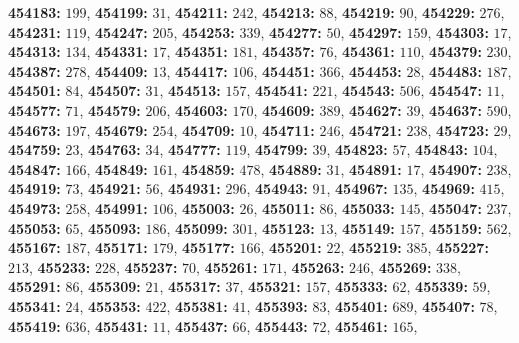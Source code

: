 \textsf{\bfseries 454183:} $199$, \textsf{\bfseries 454199:} $31$, \textsf{\bfseries 454211:} $242$, \textsf{\bfseries 454213:} $88$, \textsf{\bfseries 454219:} $90$, \textsf{\bfseries 454229:} $276$, \textsf{\bfseries 454231:} $119$, \textsf{\bfseries 454247:} $205$, \textsf{\bfseries 454253:} $339$, \textsf{\bfseries 454277:} $50$, \textsf{\bfseries 454297:} $159$, \textsf{\bfseries 454303:} $17$, \textsf{\bfseries 454313:} $134$, \textsf{\bfseries 454331:} $17$, \textsf{\bfseries 454351:} $181$, \textsf{\bfseries 454357:} $76$, \textsf{\bfseries 454361:} $110$, \textsf{\bfseries 454379:} $230$, \textsf{\bfseries 454387:} $278$, \textsf{\bfseries 454409:} $13$, \textsf{\bfseries 454417:} $106$, \textsf{\bfseries 454451:} $366$, \textsf{\bfseries 454453:} $28$, \textsf{\bfseries 454483:} $187$, \textsf{\bfseries 454501:} $84$, \textsf{\bfseries 454507:} $31$, \textsf{\bfseries 454513:} $157$, \textsf{\bfseries 454541:} $221$, \textsf{\bfseries 454543:} $506$, \textsf{\bfseries 454547:} $11$, \textsf{\bfseries 454577:} $71$, \textsf{\bfseries 454579:} $206$, \textsf{\bfseries 454603:} $170$, \textsf{\bfseries 454609:} $389$, \textsf{\bfseries 454627:} $39$, \textsf{\bfseries 454637:} $590$, \textsf{\bfseries 454673:} $197$, \textsf{\bfseries 454679:} $254$, \textsf{\bfseries 454709:} $10$, \textsf{\bfseries 454711:} $246$, \textsf{\bfseries 454721:} $238$, \textsf{\bfseries 454723:} $29$, \textsf{\bfseries 454759:} $23$, \textsf{\bfseries 454763:} $34$, \textsf{\bfseries 454777:} $119$, \textsf{\bfseries 454799:} $39$, \textsf{\bfseries 454823:} $57$, \textsf{\bfseries 454843:} $104$, \textsf{\bfseries 454847:} $166$, \textsf{\bfseries 454849:} $161$, \textsf{\bfseries 454859:} $478$, \textsf{\bfseries 454889:} $31$, \textsf{\bfseries 454891:} $17$, \textsf{\bfseries 454907:} $238$, \textsf{\bfseries 454919:} $73$, \textsf{\bfseries 454921:} $56$, \textsf{\bfseries 454931:} $296$, \textsf{\bfseries 454943:} $91$, \textsf{\bfseries 454967:} $135$, \textsf{\bfseries 454969:} $415$, \textsf{\bfseries 454973:} $258$, \textsf{\bfseries 454991:} $106$, \textsf{\bfseries 455003:} $26$, \textsf{\bfseries 455011:} $86$, \textsf{\bfseries 455033:} $145$, \textsf{\bfseries 455047:} $237$, \textsf{\bfseries 455053:} $65$, \textsf{\bfseries 455093:} $186$, \textsf{\bfseries 455099:} $301$, \textsf{\bfseries 455123:} $13$, \textsf{\bfseries 455149:} $157$, \textsf{\bfseries 455159:} $562$, \textsf{\bfseries 455167:} $187$, \textsf{\bfseries 455171:} $179$, \textsf{\bfseries 455177:} $166$, \textsf{\bfseries 455201:} $22$, \textsf{\bfseries 455219:} $385$, \textsf{\bfseries 455227:} $213$, \textsf{\bfseries 455233:} $228$, \textsf{\bfseries 455237:} $70$, \textsf{\bfseries 455261:} $171$, \textsf{\bfseries 455263:} $246$, \textsf{\bfseries 455269:} $338$, \textsf{\bfseries 455291:} $86$, \textsf{\bfseries 455309:} $21$, \textsf{\bfseries 455317:} $37$, \textsf{\bfseries 455321:} $157$, \textsf{\bfseries 455333:} $62$, \textsf{\bfseries 455339:} $59$, \textsf{\bfseries 455341:} $24$, \textsf{\bfseries 455353:} $422$, \textsf{\bfseries 455381:} $41$, \textsf{\bfseries 455393:} $83$, \textsf{\bfseries 455401:} $689$, \textsf{\bfseries 455407:} $78$, \textsf{\bfseries 455419:} $636$, \textsf{\bfseries 455431:} $11$, \textsf{\bfseries 455437:} $66$, \textsf{\bfseries 455443:} $72$, \textsf{\bfseries 455461:} $165$, 
